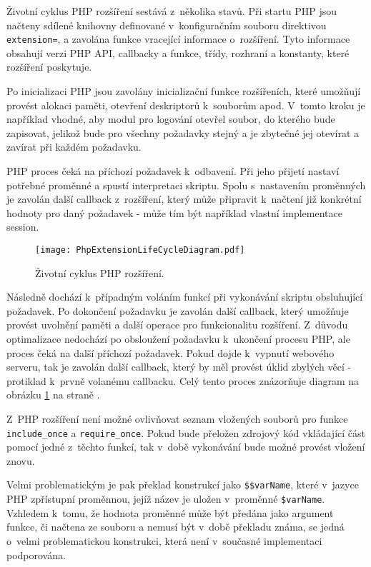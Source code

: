 \documentclass[czech]{ExcelAtFIT}
\newcommand{\function}[1]{\texttt{#1}}
\begin{document}
	Životní cyklus PHP rozšíření sestává z~několika stavů. Při startu PHP jsou načteny sdílené knihovny definované v~konfiguračním souboru direktivou \function{extension=}, a zavolána funkce vracející informace o~rozšíření. Tyto informace obsahují verzi PHP API, callbacky a funkce, třídy, rozhraní a konstanty, které rozšíření poskytuje.

	Po inicializaci PHP jsou zavolány inicializační funkce rozšířeních, které umožňují provést alokaci paměti, otevření deskriptorů k~souborům apod. V~tomto kroku je například vhodné, aby modul pro logování otevřel soubor, do kterého bude zapisovat, jelikož bude pro všechny požadavky stejný a je zbytečné jej otevírat a zavírat při každém požadavku.

	PHP proces čeká na příchozí požadavek k~odbavení. Při jeho přijetí nastaví potřebné proměnné a spustí interpretaci skriptu. Spolu s~nastavením proměnných je zavolán další callback z~rozšíření, který může připravit k~načtení již konkrétní hodnoty pro daný požadavek - může tím být například vlastní implementace session.

	\begin{figure}[t]
		\centering
		\texttt{[image: PhpExtensionLifeCycleDiagram.pdf]}
		\caption{Životní cyklus PHP rozšíření.}
		\label{fig:phpExtensionLifeCycle}
	\end{figure}


	Následně dochází k~případným voláním funkcí při vykonávání skriptu obsluhující požadavek. Po dokončení požadavku je zavolán další callback, který umožňuje provést uvolnění paměti a další operace pro funkcionalitu rozšíření. Z~důvodu optimalizace nedochází po obsloužení požadavku k~ukončení procesu PHP, ale proces čeká na další příchozí požadavek. Pokud dojde k~vypnutí webového serveru, tak je zavolán další callback, který by měl provést úklid zbylých věcí - protiklad k~prvně volanému callbacku. Celý tento proces znázorňuje diagram na obrázku \ref{fig:phpExtensionLifeCycle} na straně \pageref{fig:phpExtensionLifeCycle}.


	Z~PHP rozšíření není možné ovlivňovat seznam vložených souborů pro funkce \function{include\_once} a \function{require\_once}. Pokud bude přeložen zdrojový kód vkládající část pomocí jedné z~těchto funkcí, tak v~době vykonávání bude možné provést vložení znovu.

	Velmi problematickým je pak překlad konstrukcí jako \function{\$\$varName}, které v~jazyce PHP zpřístupní proměnnou, jejíž název je uložen v~proměnné \function{\$varName}. Vzhledem k~tomu, že hodnota proměnné může být předána jako argument funkce, či načtena ze souboru a nemusí být v~době překladu známa, se jedná o~velmi problematickou konstrukci, která není v~současné implementaci podporována.
\end{document}
